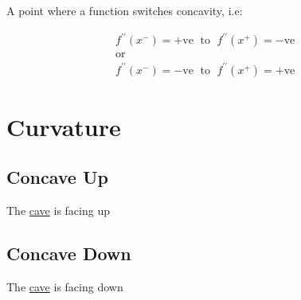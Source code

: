 \documentclass[12pt letter]{report}
\begin{document}
A point where a function switches concavity, i.e:

\begin{gather*}
	f^{\prime\prime}(x^{-}) = +\text{ve } \; \text{to } \; f^{\prime\prime}(x^{+}) = -\text{ve }\\
	\text{or } \\
	f^{\prime\prime}(x^{-}) = -\text{ve } \; \text{to } \; f^{\prime\prime}(x^{+}) = +\text{ve }
\end{gather*}

\section{Curvature}
\subsection{Concave Up}
The \underline{cave} is facing up

\subsection{Concave Down}
The \underline{cave} is facing down
\end{document}
